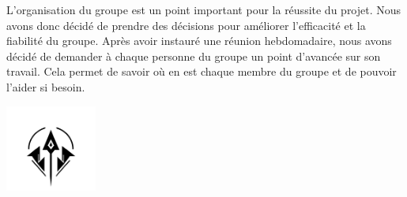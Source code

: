 L'organisation du groupe est un point important pour la réussite du projet.
Nous avons donc décidé de prendre des décisions pour améliorer l'efficacité et la fiabilité du groupe.
Après avoir instauré une réunion hebdomadaire, nous avons décidé de demander à chaque personne du groupe un point d'avancée sur son travail.
Cela permet de savoir où en est chaque membre du groupe et de pouvoir l'aider si besoin.


\centering
\vspace*{1.5cm}
\includegraphics[width=3cm]{format/logo.png}



